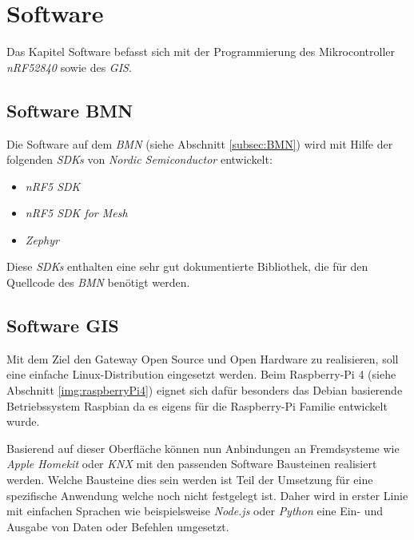 \clearpage
\section{Software}\label{sec:Software}
Das Kapitel Software befasst sich mit der Programmierung des Mikrocontroller \textit{nRF52840} sowie des \textit{GIS}.

\subsection{Software BMN}\label{subsec:SoftwareBMN}
Die Software auf dem \textit{BMN} (siehe Abschnitt \ref{subsec:BMN}) wird mit Hilfe der folgenden \textit{SDKs} von \textit{Nordic Semiconductor} entwickelt:

 \begin{itemize} 
	\item \textit{nRF5 SDK}\cite{nordic_semiconductor_nrf5_2019}
	\item \textit{nRF5 SDK for Mesh}\cite{nordic_semiconductor_nrf5_2019-1}
	\item \textit{Zephyr}\cite{zephyr_project_zephyr_2019}
\end{itemize}

Diese \textit{SDKs} enthalten eine sehr gut dokumentierte Bibliothek, die für den Quellcode des \textit{BMN} benötigt werden.


\subsection{Software GIS}\label{subsec:SoftwareGIS}
Mit dem Ziel den Gateway Open Source und Open Hardware zu realisieren, soll eine einfache Linux-Distribution eingesetzt werden. Beim Raspberry-Pi 4 (siehe Abschnitt \ref{img:raspberryPi4}) eignet sich dafür besonders das Debian basierende Betriebssystem Raspbian da es eigens für die Raspberry-Pi Familie entwickelt wurde.

Basierend auf dieser Oberfläche können nun Anbindungen an Fremdsysteme wie \textit{Apple Homekit} oder \textit{KNX} mit den passenden Software Bausteinen realisiert werden. Welche Bausteine dies sein werden ist Teil der Umsetzung für eine spezifische Anwendung welche noch nicht festgelegt ist. Daher wird in erster Linie mit einfachen Sprachen wie beispielsweise \textit{Node.js} oder \textit{Python} eine Ein- und Ausgabe von Daten oder Befehlen umgesetzt. 

